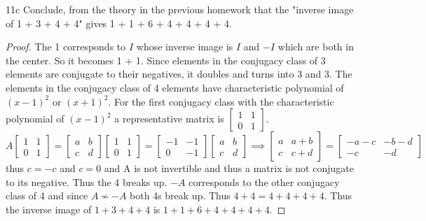\documentclass{article}
\begin{document}
\begin{PROB}{11c}\label{Problem 11c.}
    Conclude, from the theory in the previous homework that the "inverse image of 1 + 3 + 4 + 4" gives 1 + 1 + 6 + 4 + 4 + 4 + 4.
\end{PROB}
\begin{proof}
    The 1 corresponds to $I$ whose inverse image is $I$ and $-I$ which are both in the center. So it becomes 1 + 1. Since elements in the conjugacy class of $3$ elements are conjugate to their negatives, it doubles and turns into $3$ and $3$. The elements in the conjugacy class of 4 elements have characteristic polynomial of $(x - 1)^2$ or $(x + 1)^2$. For the first conjugacy class with the characteristic polynomial of $(x - 1)^2$ a representative matrix is $\begin{bmatrix}
        1 & 1 \\ 0 & 1
    \end{bmatrix}$. $A\begin{bmatrix}
        1 & 1 \\ 0 & 1
    \end{bmatrix} = \begin{bmatrix}
        a & b \\ c & d
    \end{bmatrix}\begin{bmatrix}
        1 & 1 \\ 0 & 1
    \end{bmatrix} = \begin{bmatrix}
        -1 & -1 \\ 0 & -1
    \end{bmatrix}\begin{bmatrix}
        a & b \\ c & d
    \end{bmatrix} \implies \begin{bmatrix}
        a & a + b \\ c & c + d
    \end{bmatrix} = \begin{bmatrix}
        -a - c & -b - d \\ -c & -d
    \end{bmatrix}$ thus $c = -c$ and $c = 0$ and A is not invertible and thus a matrix is not conjugate to its negative. Thus the 4 breaks up. $-A$ corresponds to the other conjugacy class of 4 and since $A \not \sim -A$ both 4s break up. Thus $4 + 4 = 4 + 4 + 4 + 4$. Thus the inverse image of $1 + 3 + 4 + 4$ is $1 + 1 + 6 + 4 + 4 + 4 + 4$.
\end{proof}
\end{document}
